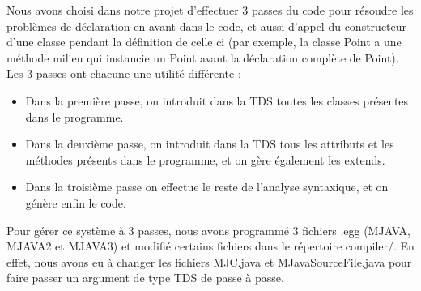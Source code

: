 Nous avons choisi dans notre projet d'effectuer 3 passes du code pour résoudre
les problèmes de déclaration en avant dans le code, et aussi d'appel du
constructeur d'une classe pendant la définition de celle ci (par exemple, la
classe Point a une méthode milieu qui instancie un Point avant la déclaration
complète de Point).\\
Les 3 passes ont chacune une utilité différente :\\ 
\begin{itemize}
 \item Dans la première passe, on introduit dans la TDS toutes les classes présentes dans le programme.
 \item Dans la deuxième passe, on introduit dans la TDS tous les attributs et les méthodes présents dans le programme, et on gère également les extends.
 \item Dans la troisième passe on effectue le reste de l'analyse syntaxique, et on génère enfin le code.\\
\end{itemize}

Pour gérer ce système à 3 passes, nous avons programmé 3 fichiers .egg (MJAVA,
MJAVA2 et MJAVA3) et modifié certains fichiers dans le répertoire compiler/. En
effet, nous avons eu à changer les fichiers MJC.java et MJavaSourceFile.java
pour faire passer un argument de type TDS de passe à passe.\\




